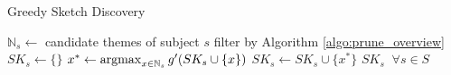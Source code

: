 \begin{algorithm}[h]
\caption{Greedy Sketch Discovery}
\label{algo:greedy}
\begin{algorithmic}[1]
\State $\mathbb{N}_s \gets$ candidate themes of subject $s$ filter by Algorithm \ref{algo:prune_overview}
\State $SK_s \gets \{\}$
	\State $x^* \gets \operatorname*{argmax}_{x\in \mathbb{N}_s}g'(SK_s\cup \{x\})$ \label{code:greedy}
	\State $SK_s \gets SK_s \cup \{x^*\}$
\EndFor
\EndFor
\State \Return $SK_s \;\; \forall s \in S$
\end{algorithmic}
\end{algorithm}

